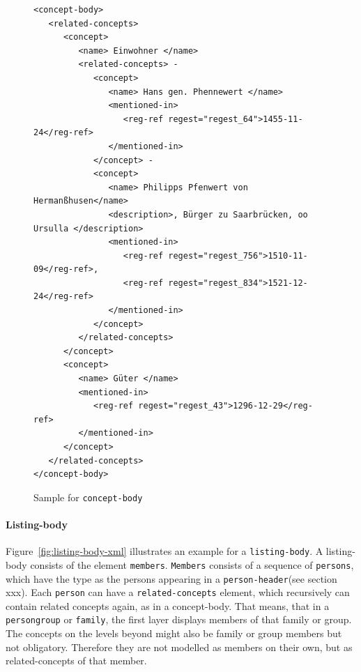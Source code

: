 \begin{figure}[H]
\centering
\begin{verbatim}
<concept-body>
   <related-concepts>
      <concept>
         <name> Einwohner </name>
         <related-concepts> -
            <concept>
               <name> Hans gen. Phennewert </name>
               <mentioned-in>
                  <reg-ref regest="regest_64">1455-11-24</reg-ref>
               </mentioned-in>
            </concept> -
            <concept>
               <name> Philipps Pfenwert von Hermanßhusen</name>
               <description>, Bürger zu Saarbrücken, oo Ursulla </description>
               <mentioned-in>
                  <reg-ref regest="regest_756">1510-11-09</reg-ref>, 
                  <reg-ref regest="regest_834">1521-12-24</reg-ref>
               </mentioned-in>
            </concept>
         </related-concepts>
      </concept>
      <concept>
         <name> Güter </name>
         <mentioned-in>
            <reg-ref regest="regest_43">1296-12-29</reg-ref>
         </mentioned-in>
      </concept>
   </related-concepts>
</concept-body>
\end{verbatim}
\caption{Sample for \texttt{concept-body}}
\label{fig:concept-body-xml}
\end{figure}

\paragraph{Listing-body}
Figure~\ref{fig:listing-body-xml} illustrates an example for a \texttt{listing-body}. A listing-body consists of the element \texttt{members}. \texttt{Members} consists of a sequence of \texttt{persons}, which have the type as the persons appearing in a \texttt{person-header}(see section xxx). Each \texttt{person} can have a \texttt{related-concepts} element, which recursively can contain related concepts again, as in a concept-body.
That means, that in a \texttt{persongroup} or \texttt{family}, the first layer displays members of that family or group. The concepts on the levels beyond might also be family or group members but not obligatory. Therefore they are not modelled as members on their own, but as related-concepts of that member.


